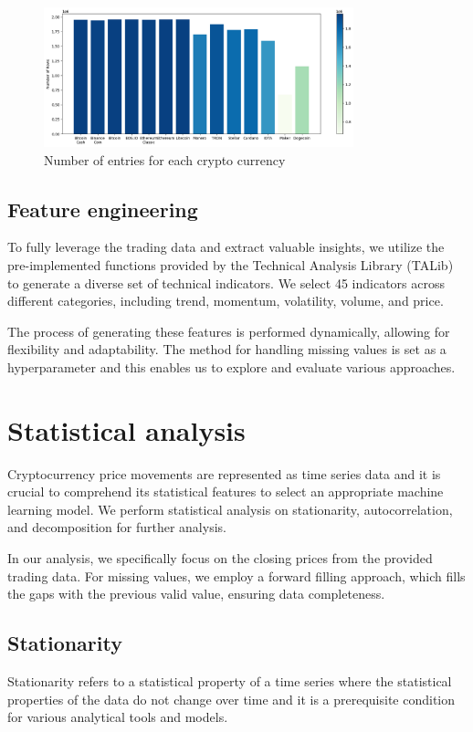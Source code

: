 \documentclass{article}
\begin{document}
\begin{figure}[H]
	\centering
	\includegraphics[width=0.8\textwidth]{Data/Number.png}
	\caption{Number of entries for each crypto currency}
\end{figure}

\subsection{Feature engineering}
To fully leverage the trading data and extract valuable insights, we utilize the pre-implemented functions provided by the Technical Analysis Library (TALib) to generate a diverse set of technical indicators. We select 45 indicators across different categories, including trend, momentum, volatility, volume, and price. 

The process of generating these features is performed dynamically, allowing for flexibility and adaptability. The method for handling missing values is set as a hyperparameter and this enables us to explore and evaluate various approaches. 

\section{Statistical analysis}
Cryptocurrency price movements are represented as time series data and it is crucial to comprehend its statistical features to select an appropriate machine learning model. We perform statistical analysis on stationarity, autocorrelation, and decomposition for further analysis.

In our analysis, we specifically focus on the closing prices from the provided trading data. For missing values, we employ a forward filling approach, which fills the gaps with the previous valid value, ensuring data completeness.

\subsection{Stationarity}
Stationarity refers to a statistical property of a time series where the statistical properties of the data do not change over time and it is a prerequisite condition for various analytical tools and models.
\end{document}
